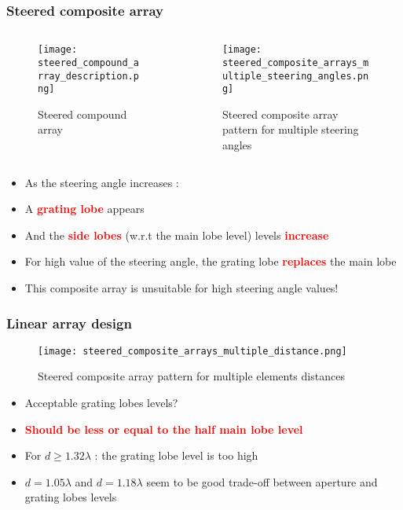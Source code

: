 \documentclass[UKenglish,8pt,aspectratio=1610]{beamer}
\begin{document}
		\begin{frame}
			\frametitle{Steered composite array}
			
	\begin{columns}
	
	\begin{column}{0.37\textwidth}
\vspace{-15pt}
\begin{figure}[h!]
	\centering
	\texttt{[image: steered\_compound\_array\_description.png]}
	\caption{Steered compound array}
\end{figure}
	\end{column}
	
	\begin{column}{0.63\textwidth}
	\vspace{-15pt}
	\begin{figure}[h!]
		\centering
		\texttt{[image: steered\_composite\_arrays\_multiple\_steering\_angles.png]}
		\caption{Steered composite array pattern for multiple steering angles}
	\end{figure}
	\end{column}
\end{columns}

\begin{itemize}
	\item As the steering angle increases :
	\item A \textcolor{red}{\textbf{grating lobe}} appears
	\item And the \textcolor{red}{\textbf{side lobes}} (w.r.t the main lobe level) levels \textcolor{red}{\textbf{increase}}
	\item For high value of the steering angle, the grating lobe \textcolor{red}{\textbf{replaces}} the main lobe
	\item This composite array is unsuitable for high steering angle values!
\end{itemize}
		\end{frame}
	
\begin{frame}
	\frametitle{Linear array design}
	\vspace{-10pt}
	\begin{figure}[h!]
		\centering
		\texttt{[image: steered\_composite\_arrays\_multiple\_distance.png]}
		\caption{Steered composite array pattern for multiple elements distances}
	\end{figure}
\begin{itemize}
	\item Acceptable grating lobes levels?
	\item \textcolor{red}{\textbf{Should be less or equal to the half main lobe level}}
	\item For $d\geq1.32\lambda$ : the grating lobe level is too high
	\item $d=1.05\lambda$ and $d=1.18\lambda$ seem to be good trade-off between aperture and grating lobes levels
\end{itemize}
\end{frame}
\end{document}
